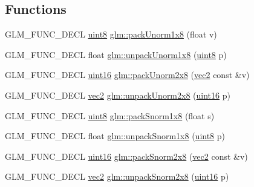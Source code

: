 \subsection*{Functions}
\begin{DoxyCompactItemize}
\item 
G\+L\+M\+\_\+\+F\+U\+N\+C\+\_\+\+D\+E\+CL \hyperlink{group__gtc__type__precision_ga1a7dcd8aac97cc8020817c94049deff2}{uint8} \hyperlink{group__gtc__packing_ga2f9963e5d762b10085b280d3662017ba}{glm\+::pack\+Unorm1x8} (float v)
\item 
G\+L\+M\+\_\+\+F\+U\+N\+C\+\_\+\+D\+E\+CL float \hyperlink{group__gtc__packing_ga32f3f2642df2ea87449d59fb614a8305}{glm\+::unpack\+Unorm1x8} (\hyperlink{group__gtc__type__precision_ga1a7dcd8aac97cc8020817c94049deff2}{uint8} p)
\item 
G\+L\+M\+\_\+\+F\+U\+N\+C\+\_\+\+D\+E\+CL \hyperlink{group__gtc__type__precision_gad8c2939e1fdd8e5828b31d95c52255d5}{uint16} \hyperlink{group__gtc__packing_ga833288fc0d4a79f19d0db75a6843bfe6}{glm\+::pack\+Unorm2x8} (\hyperlink{group__core__types_gaa1618f51db67eaa145db101d8c8431d8}{vec2} const \&v)
\item 
G\+L\+M\+\_\+\+F\+U\+N\+C\+\_\+\+D\+E\+CL \hyperlink{group__core__types_gaa1618f51db67eaa145db101d8c8431d8}{vec2} \hyperlink{group__gtc__packing_ga96ce0c24339ee676e28a027fffd1edf6}{glm\+::unpack\+Unorm2x8} (\hyperlink{group__gtc__type__precision_gad8c2939e1fdd8e5828b31d95c52255d5}{uint16} p)
\item 
G\+L\+M\+\_\+\+F\+U\+N\+C\+\_\+\+D\+E\+CL \hyperlink{group__gtc__type__precision_ga1a7dcd8aac97cc8020817c94049deff2}{uint8} \hyperlink{group__gtc__packing_ga26b6cd7a35c46c4b6a342f3b97b47423}{glm\+::pack\+Snorm1x8} (float s)
\item 
G\+L\+M\+\_\+\+F\+U\+N\+C\+\_\+\+D\+E\+CL float \hyperlink{group__gtc__packing_ga6f2bebf536fbf7c8b97d4b306bb3354e}{glm\+::unpack\+Snorm1x8} (\hyperlink{group__gtc__type__precision_ga1a7dcd8aac97cc8020817c94049deff2}{uint8} p)
\item 
G\+L\+M\+\_\+\+F\+U\+N\+C\+\_\+\+D\+E\+CL \hyperlink{group__gtc__type__precision_gad8c2939e1fdd8e5828b31d95c52255d5}{uint16} \hyperlink{group__gtc__packing_ga05d08a82923166ec7cd5d0e6154c9953}{glm\+::pack\+Snorm2x8} (\hyperlink{group__core__types_gaa1618f51db67eaa145db101d8c8431d8}{vec2} const \&v)
\item 
G\+L\+M\+\_\+\+F\+U\+N\+C\+\_\+\+D\+E\+CL \hyperlink{group__core__types_gaa1618f51db67eaa145db101d8c8431d8}{vec2} \hyperlink{group__gtc__packing_ga27f30f0281b88e152b0895f5e2ead878}{glm\+::unpack\+Snorm2x8} (\hyperlink{group__gtc__type__precision_gad8c2939e1fdd8e5828b31d95c52255d5}{uint16} p)

\end{DoxyCompactItemize}
